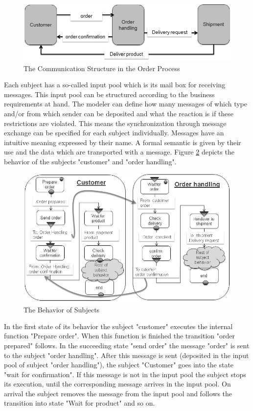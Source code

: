 \begin{figure}[ph]
	\centering
	\includegraphics[width=0.7\linewidth]{20181026-Ontologie-Bilder/Grafiken-Ontologie/SUbjectExecution/OrderComStructure}
	\caption[The Communication Structure in the Order Process]{The Communication Structure in the Order Process}
	\label{fig:ordercomstructure}
\end{figure}

Each subject has a so-called input pool which is its mail box for receiving messages. This input pool can be structured according to the business requirements at hand. The modeler can define how many messages of which type and/or from which sender can be deposited and what the reaction is if these restrictions are violated. This means the synchronization through message exchange can be specified for each subject individually.
Messages have an intuitive meaning expressed by their name. A formal semantic is given by their use and the data which are transported with a message. Figure \ref{fig:ordercustomerorderhandling} depicts the behavior of the subjects "customer" and "order handling".\\
\newpage
\begin{figure}[ph]
	\centering
	\includegraphics[width=0.7\linewidth]{20181026-Ontologie-Bilder/Grafiken-Ontologie/SUbjectExecution/OrderCustomerOrderHandling}
	\caption[The Behavior of Subjects]{The Behavior of Subjects}
	\label{fig:ordercustomerorderhandling}
\end{figure}

In the first state of its behavior the subject "customer" executes the internal function "Prepare order". When this function is finished the transition "order prepared" follows. In the succeeding state "send order" the message "order" is sent to the subject "order handling". After this message is sent (deposited in the input pool of subject "order handling"), the subject "Customer" goes into the state "wait for confirmation". If this message is not in the input pool the subject stops its execution, until the corresponding message arrives in the input pool. On arrival the subject removes the message from the input pool and follows the transition into state "Wait for product" and so on.

